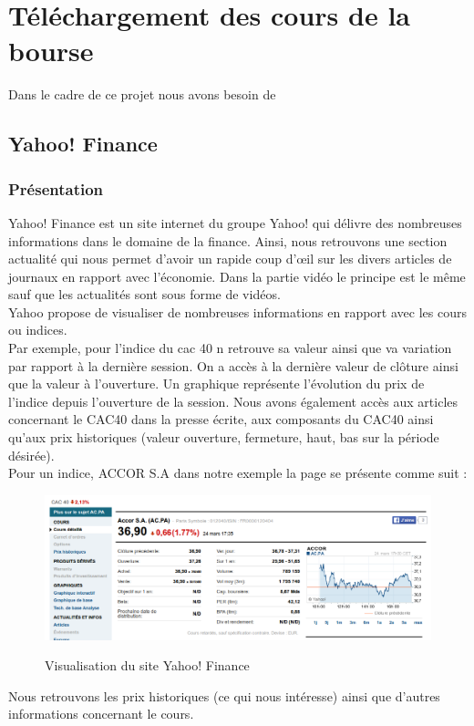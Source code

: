 \section{Téléchargement des cours de la bourse}

Dans le cadre de ce projet nous avons besoin de 

\subsection{Yahoo! Finance}

\subsubsection{Présentation}

Yahoo! Finance est un site internet du groupe Yahoo! qui délivre des nombreuses informations dans le domaine de la finance. Ainsi, nous retrouvons une section actualité qui nous permet d'avoir un rapide coup d’œil sur les divers articles de journaux en rapport avec l'économie. Dans la partie vidéo le principe est le même sauf que les actualités sont sous forme de vidéos. \\

Yahoo propose de visualiser de nombreuses informations en rapport avec les cours ou indices. \\

Par exemple, pour l'indice du cac 40 n retrouve sa valeur ainsi que va variation par rapport à la dernière session. On a accès à la dernière valeur de clôture ainsi que la valeur à l'ouverture. Un graphique représente l'évolution du prix de l'indice depuis l'ouverture de la session. Nous avons également accès aux articles concernant le CAC40 dans la presse écrite, aux composants du CAC40 ainsi qu'aux prix historiques (valeur ouverture, fermeture, haut, bas sur la période désirée). \\


Pour un indice, ACCOR S.A dans notre exemple la page se présente comme suit : \\
\begin{figure}[H]
  \center
  \includegraphics[scale=0.4]{../graph/yahoo.png} \\
  \caption{Visualisation du site Yahoo! Finance}
\end{figure}
Nous retrouvons les prix historiques (ce qui nous intéresse) ainsi que d'autres informations concernant le cours. 

